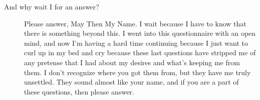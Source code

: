 \begin{description}
\item[And why wait I for an answer?]
Please answer, May Then My Name. I wait because I have to know that there is something beyond this. I went into this questionnaire with an open mind, and now I'm having a hard time continuing because I just want to curl up in my bed and cry because these last questions have stripped me of any pretense that I had about my desires and what's keeping me from them. I don't recognize where you got them from, but they have me truly unsettled. They sound almost like your name, and if you are a part of these questions, then please answer.
\end{description}
